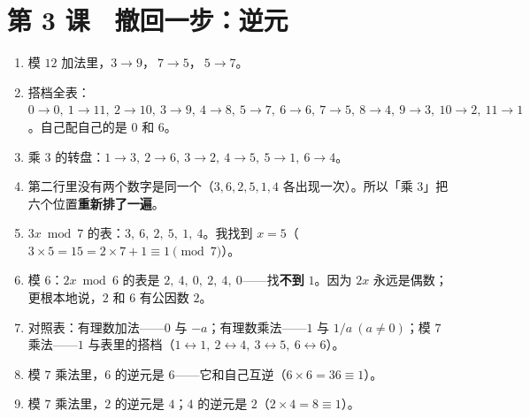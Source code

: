 \section*{第 3 课　撤回一步：逆元}
\begin{enumerate}
  \item 模 \(12\) 加法里，\(3\to9\)，\(\ 7\to5\)，\(\ 5\to7\)。
  \item 搭档全表：\(0\to0,\ 1\to11,\ 2\to10,\ 3\to9,\ 4\to8,\ 5\to7,\ 6\to6,\ 7\to5,\ 8\to4,\ 9\to3,\ 10\to2,\ 11\to1\)。自己配自己的是 \(0\) 和 \(6\)。
  \item 乘 \(3\) 的转盘：\(1\to3,\ 2\to6,\ 3\to2,\ 4\to5,\ 5\to1,\ 6\to4\)。
  \item 第二行里没有两个数字是同一个（\(3,6,2,5,1,4\) 各出现一次）。所以「乘 \(3\)」把六个位置\textbf{重新排了一遍}。
  \item \(3x\bmod7\) 的表：\(3,\ 6,\ 2,\ 5,\ 1,\ 4\)。我找到 \(x=5\)（\(3\times5=15=2\times7+1\equiv1\pmod7\)）。
  \item 模 \(6\)：\(2x\bmod6\) 的表是 \(2,\ 4,\ 0,\ 2,\ 4,\ 0\)——找\textbf{不到} \(1\)。因为 \(2x\) 永远是偶数；更根本地说，\(2\) 和 \(6\) 有公因数 \(2\)。
  \item 对照表：有理数加法——\(0\) 与 \(-a\)；有理数乘法——\(1\) 与 \(1/a\ (a\neq0)\)；模 \(7\) 乘法——\(1\) 与表里的搭档（\(1\leftrightarrow1,\ 2\leftrightarrow4,\ 3\leftrightarrow5,\ 6\leftrightarrow6\)）。
  \item 模 \(7\) 乘法里，\(6\) 的逆元是 \(6\)——它和自己互逆（\(6\times6=36\equiv1\)）。
  \item 模 \(7\) 乘法里，\(2\) 的逆元是 \(4\)；\(4\) 的逆元是 \(2\)（\(2\times4=8\equiv1\)）。
\end{enumerate}

